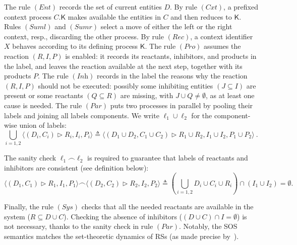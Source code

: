 \documentclass[sn-mathphys-num,a4paper,iicol,lineno,pdflatex]{sn-jnl-hacked}
\newcommand{\nil}{\mathbf{0}}
\newcommand{\obs}[2]{\langle #1\vartriangleright #2\rangle}
\theoremstyle{thmstyleone}%
\theoremstyle{thmstyletwo}%
\theoremstyle{thmstylethree}%
\begin{document}
The rule $(\textit{Ent})$ records the set of current entities $D$.
By rule $(\textit{Cxt})$, a prefixed context process $C.\mathsf{K}$ makes available the entities in $C$ and then reduces to $\mathsf{K}$. 
Rules $(\textit{Suml})$ and $(\textit{Sumr})$ select a move of either the left or the right context, resp., discarding the other process.
By rule $(\textit{Rec})$, a context identifier $X$ behaves according to its defining process $\mathsf{K}$.
The rule $(\textit{Pro})$ assumes the reaction $(R,I,P)$ is enabled: it records its reactants, inhibitors, and products in the label, and leaves the reaction  available at the next step, together with its products $P$.
The rule $(\textit{Inh})$ records in the label the reasons why the reaction $(R,I,P)$ should not be executed: possibly some inhibiting entities $(J \subseteq I)$ are present or some reactants $(Q \subseteq R)$ are missing, with $J \cup Q \neq \emptyset$, as at least one cause is needed.
The rule $(\textit{Par})$ puts two processes in parallel by pooling their labels and joining all labels components. We write $\ell_1\cup\ell_2$ for the component-wise union of labels:
%
{\footnotesize
\[
\textstyle
\bigcup_{i=1,2} \obs{(D_i,C_i)}{R_i,I_i,P_i}
\triangleq 
\obs{(D_1\cup D_2,C_1\cup C_2)}{R_1\cup R_2,I_1\cup I_2,P_1\cup P_2}\ .
\]}


The sanity check $\ell_1\frown\ell_2$ is required to guarantee that labels of reactants and inhibitors are consistent (see definition below):
%
{\footnotesize
\[
\obs{(D_1,C_1)}{R_1,I_1,P_1}
\frown
\obs{(D_2,C_2)}{R_2,I_2,P_2}
\triangleq
\textstyle (\bigcup_{i=1,2} D_i\cup C_i \cup R_i) \cap (I_1\cup I_2) = \emptyset .
\]
}


Finally, the rule $(\textit{Sys})$ checks that all the needed reactants are available in the system ($R \subseteq D\cup C$). Checking the absence of inhibitors  ($(D\cup C)\cap I = \emptyset$) is not necessary, thanks to the sanity check in rule $(\textit{Par})$.
%
Notably, the SOS semantics matches the set-theoretic dynamics of RSs (as made precise by~\cite[Th.~19]{DBLP:journals/tcs/BrodoBF21}). 
\end{document}

